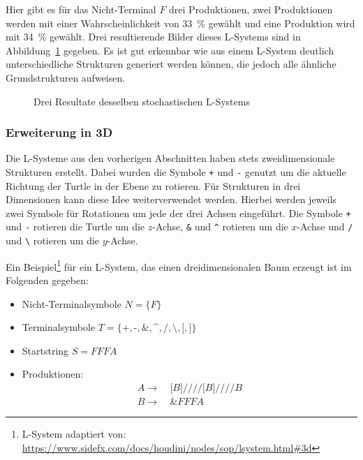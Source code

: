 Hier gibt es für das Nicht-Terminal $F$ drei Produktionen, zwei Produktionen werden mit einer Wahrscheinlichkeit von \SI{33}{\percent} gewählt und eine Produktion wird mit \SI{34}{\percent} gewählt.
Drei resultierende Bilder dieses L-Systems sind in Abbildung~\ref{fig:Stochastic} gegeben.
Es ist gut erkennbar wie aus einem L-System deutlich unterschiedliche Strukturen generiert werden können, die jedoch alle ähnliche Grundstrukturen aufweisen.
\begin{figure}[ht]
    \begin{subfigure}[t]{.25\textwidth}
        \centering
        
    \end{subfigure}
    \hfill
    \begin{subfigure}[t]{.25\textwidth}
        \centering
        
    \end{subfigure}
    \hfill
    \begin{subfigure}[t]{.25\textwidth}
        \centering
        
    \end{subfigure}
    \caption{Drei Resultate desselben stochastischen L-Systems}\label{fig:Stochastic}
\end{figure}


\subsubsection{Erweiterung in 3D}\label{subsub: L-System 3D}
Die L-Systeme aus den vorherigen Abschnitten haben stets zweidimensionale Strukturen erstellt.
Dabei wurden die Symbole \texttt{+} und \texttt{-} genutzt um die aktuelle Richtung der Turtle in der Ebene zu rotieren.
Für Strukturen in drei Dimensionen kann diese Idee weiterverwendet werden.
Hierbei werden jeweils zwei Symbole für Rotationen um jede der drei Achsen eingeführt.
Die Symbole \texttt{+} und \texttt{-} rotieren die Turtle um die $z$-Achse, \texttt{\&} und \texttt{\textasciicircum} rotieren um die $x$-Achse und \texttt{/} und \texttt{\textbackslash} rotieren um die $y$-Achse.

Ein Beispiel\footnote{L-System adaptiert von: \url{https://www.sidefx.com/docs/houdini/nodes/sop/lsystem.html\#3d}} für ein L-System, das einen dreidimensionalen Baum erzeugt ist im Folgenden gegeben:
\begin{itemize}
    \item Nicht-Terminalsymbole $N=\{F\}$
    \item Terminalsymbole $T=\{\texttt{+},\texttt{-},\texttt{\&},\texttt{\textasciicircum},\texttt{/},\texttt{\textbackslash},\texttt{[},\texttt{]}\}$
    \item Startstring $S=FFFA$
    \item Produktionen:
          \begin{align*}
              A\rightarrow & ~\texttt{[}B\texttt{]////[}B\texttt{]////}B \\
              B\rightarrow & ~\texttt{\&}FFFA
          \end{align*}
\end{itemize}

